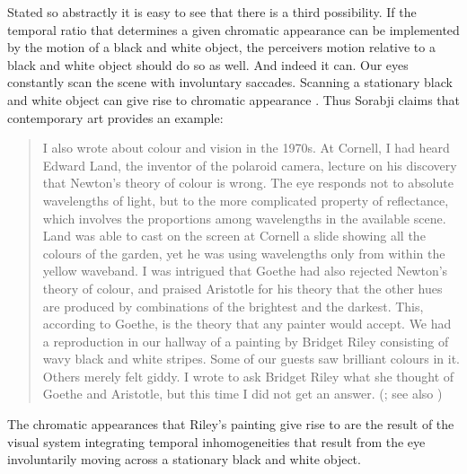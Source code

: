 Stated so abstractly it is easy to see that there is a third possibility. If the temporal ratio that determines a given chromatic appearance can be implemented by the motion of a black and white object, the perceivers motion relative to a black and white object should do so as well. And indeed it can. Our eyes constantly scan the scene with involuntary saccades. Scanning a stationary black and white object can give rise to chromatic appearance \citep[72]{Hardin:1993kn}. Thus Sorabji claims that contemporary art provides an example:
\begin{quote}
    I also wrote about colour and vision in the 1970s. At Cornell, I had heard Edward Land, the inventor of the polaroid camera, lecture on his discovery that Newton’s theory of colour is wrong. The eye responds not to absolute wavelengths of light, but to the more complicated property of reflectance, which involves the proportions among wavelengths in the available scene. Land was able to cast on the screen at Cornell a slide showing all the colours of the garden, yet he was using wavelengths only from within the yellow waveband. I was intrigued that Goethe had also rejected Newton’s theory of colour, and praised Aristotle for his theory that the other hues are produced by combinations of the brightest and the darkest. This, according to Goethe, is the theory that any painter would accept. We had a reproduction in our hallway of a painting by Bridget Riley consisting of wavy black and white stripes. Some of our guests saw brilliant colours in it. Others merely felt giddy. I wrote to ask Bridget Riley what she thought of Goethe and Aristotle, but this time I did not get an answer. (\citealt[13]{Sorabji:2005fk}; see also \citealt[295]{Sorabji:2022qf})
\end{quote}
The chromatic appearances that Riley's painting give rise to  are the result of the visual system integrating temporal inhomogeneities that result from the eye involuntarily moving across a stationary black and white object.


